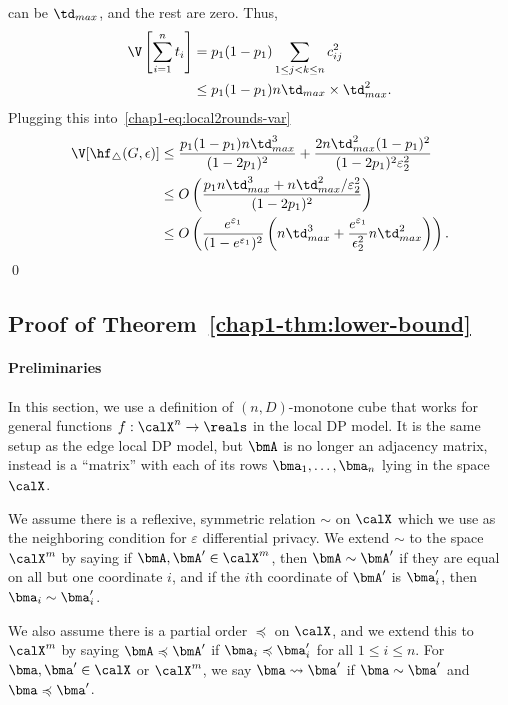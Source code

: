   can be $\td_{max}$, and the rest are zero. Thus,
  \begin{align*}
    \V\left[\sum_{i=1}^n t_i \right] &=
    p_1(1-p_1) \sum_{1 \leq j < k \leq n} c_{ij}^2 \\ 
    &\leq p_1(1-p_1) n\td_{max} \times \td_{max}^2.
  \end{align*}
  Plugging this into~\eqref{chap1-eq:local2rounds-var}
  \begin{align*}
    \V[\hf_\triangle(G,\epsilon)] &\leq \frac{p_1(1-p_1)n\td_{max}^3}{(1-2p_1)^2} +
    \frac{2n\td_{max}^2(1-p_1)^2}{(1-2p_1)^2\varepsilon_2^2} \\
    &\leq O\left(\frac{p_1 n\td_{max}^3 + n\td_{max}^2/\varepsilon_2^2}{(1-2p_1)^2} \right) \\
    &\leq O\left(\frac{e^{\varepsilon_1}}{(1-e^{\varepsilon_1})^2} \left(n\td_{max}^3 +
    \frac{e^{\varepsilon_1}}{\epsilon_2^2}n\td_{max}^2\right)\right).
  \end{align*}
  \qed

\subsection{Proof of Theorem~\ref{chap1-thm:lower-bound}}

\label{chap1-sub:proof_thm_lower-bound}

\paragraph{Preliminaries}
In this section, we use a definition of $(n,D)$-monotone cube that works for
general functions $f : \calX^{n} \rightarrow \reals$ in the
local DP model. It is the same setup as the edge local DP model, but $\bmA$ is
no longer an adjacency
matrix, instead is a ``matrix'' with each of its rows $\bma_1,\ldots,\bma_n$
lying in the space $\calX$. 

We assume there is a reflexive,
symmetric relation $\sim$ on $\calX$ which we use as the neighboring condition for
$\varepsilon$ differential privacy.
We extend $\sim$ to the space $\calX^m$ by saying
if $\bmA,\bmA' \in
\calX^m$, then $\bmA \sim \bmA'$ if they are equal on all but one coordinate
$i$, and if the $i$th coordinate of $\bmA'$ is $\bma_i'$, then $\bma_i \sim
\bma_i'$.

We also assume there is a partial order $\preccurlyeq$ on $\calX$, and we extend
this to $\calX^m$ by saying $\bmA \preccurlyeq \bmA'$ if $\bma_i \preccurlyeq
\bma_i'$ for all $1 \leq i \leq n$.
For $\bma, \bma' \in \calX$ or $\calX^m$, we say $\bma \leadsto \bma'$ if $\bma
\sim \bma'$ and $\bma \preccurlyeq \bma'$.

